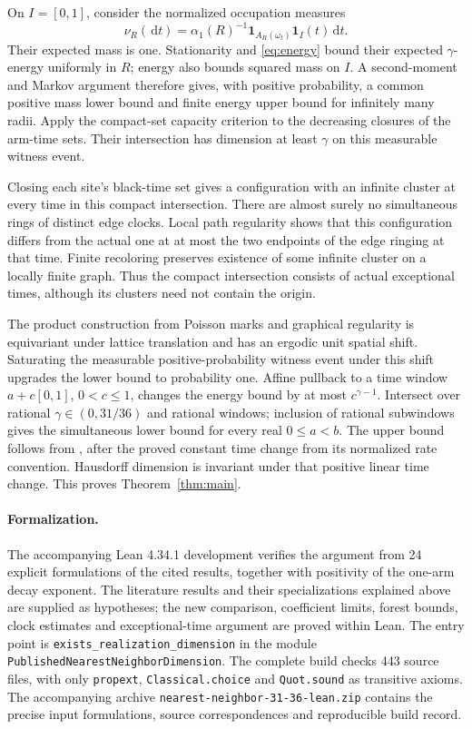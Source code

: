\documentclass[11pt]{article}
\newcommand{\one}{\mathbf 1}
\newcommand{\dd}{\,\mathrm d}
\begin{document}
On $I=[0,1]$, consider the normalized occupation
measures
\[
       \nu_R(\dd t)=
       \alpha_1(R)^{-1}\one_{A_R(\omega_t)}\one_I(t)\dd t.
\]
Their expected mass is one. Stationarity and \eqref{eq:energy} bound
their expected $\gamma$-energy uniformly in $R$; energy also bounds
squared mass on $I$. A second-moment and Markov argument therefore
gives, with positive probability, a common positive mass lower bound
and finite energy upper bound for infinitely many radii. Apply the
compact-set capacity criterion \cite[Lemma 6.2]{SS} to the decreasing
closures of the arm-time sets. Their intersection has dimension at
least $\gamma$ on this measurable witness event.

Closing each site's black-time set gives a configuration with an infinite
cluster at every time in this compact intersection. There are almost
surely no simultaneous rings of distinct edge clocks. Local path
regularity shows that this configuration differs from the actual one
at at most the two endpoints of the edge ringing at that time.
Finite recoloring preserves existence of some infinite
cluster on a locally finite graph. Thus the compact intersection consists
of actual exceptional times, although its clusters need not contain
the origin.

The product construction from Poisson marks \cite{LP} and graphical
regularity \cite[Appendix A]{GV} is equivariant under lattice translation
and has an ergodic unit spatial shift. Saturating the measurable
positive-probability witness event under this shift upgrades the lower
bound to probability one. Affine pullback to a time window $a+c[0,1]$,
$0<c\leq1$, changes the energy bound by at most $c^{\gamma-1}$.
Intersect over rational $\gamma\in(0,31/36)$ and rational windows;
inclusion of rational subwindows gives the simultaneous lower bound
for every real $0\leq a<b$.
The upper bound follows from \cite[Proposition 3.3]{GV}, after the proved
constant time change from its normalized rate convention. Hausdorff
dimension is invariant under that positive linear time change. This
proves Theorem~\ref{thm:main}.

\paragraph{Formalization.}
The accompanying Lean 4.34.1 development verifies the argument from
24 explicit formulations of the cited results, together with positivity
of the one-arm decay exponent. The literature results and their
specializations explained above are supplied as hypotheses; the new
comparison, coefficient limits, forest bounds, clock estimates and
exceptional-time argument are proved within Lean. The entry point is
\texttt{exists\_realization\_dimension} in the module
\texttt{PublishedNearestNeighborDimension}. The complete build checks
443 source files, with only \texttt{propext}, \texttt{Classical.choice}
and \texttt{Quot.sound} as transitive axioms. The accompanying archive
\texttt{nearest-neighbor-31-36-lean.zip} contains the precise input
formulations, source correspondences and reproducible build record.
\end{document}
